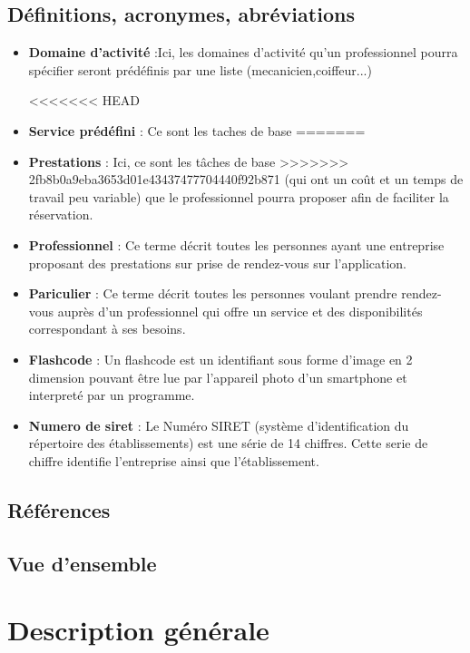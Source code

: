 \documentclass{article}
\begin{document}
\subsection{Définitions, acronymes, abréviations}
\begin{itemize}
\item \textbf{Domaine d'activité} :Ici, les domaines d'activité qu'un professionnel pourra spécifier seront prédéfinis par une liste (mecanicien,coiffeur...)

<<<<<<< HEAD
\item \textbf{Service prédéfini} : Ce sont les taches de base
=======
\item \textbf{Prestations} : Ici, ce sont les tâches de base 
>>>>>>> 2fb8b0a9eba3653d01e43437477704440f92b871
(qui ont un coût et un temps de travail peu variable) que le professionnel pourra proposer afin de faciliter la réservation.
\item \textbf{Professionnel} : Ce terme décrit toutes les personnes ayant une entreprise proposant des
  prestations sur prise de rendez-vous sur l'application.
\item \textbf{Pariculier} : Ce terme décrit toutes les personnes
  voulant prendre rendez-vous auprès d'un professionnel qui offre un service et des disponibilités correspondant à ses besoins.
\item \textbf{Flashcode} : Un flashcode est un identifiant sous forme
  d'image en 2 dimension pouvant être lue par l'appareil photo d'un smartphone et
  interpreté par un programme.
\item \textbf{Numero de siret} : Le Numéro SIRET (système d'identification du répertoire des établissements) est une série de 14 chiffres.
Cette serie de chiffre identifie l'entreprise ainsi que l'établissement.
\end{itemize}


\subsection{Références}

\subsection{Vue d'ensemble}


\section{Description générale}
\end{document}
